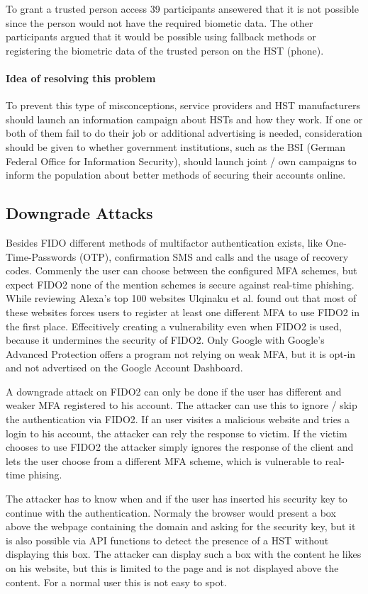 \documentclass[runningheads]{llncs}
\begin{document}
To grant a trusted person access 39 participants ansewered that it is not possible since the person would not have the required biometic data. The other participants argued that it would be possible using fallback methods or registering the biometric data of the trusted person on the HST (phone).

\paragraph{Idea of resolving this problem}
To prevent this type of misconceptions, service providers and HST manufacturers should launch an information campaign about HSTs and how they work. 
If one or both of them fail to do their job or additional advertising is needed, consideration should be given to whether government institutions, such as the BSI (German Federal Office for Information Security), should launch joint / own campaigns to inform the population about better methods of securing their accounts online.

\subsection{Downgrade Attacks}
Besides FIDO different methods of multifactor authentication exists, like One-Time-Passwords (OTP), confirmation SMS and calls and the usage of recovery codes. Commenly the user can choose between the configured MFA schemes, but expect FIDO2 none of the mention schemes is secure against real-time phishing. While reviewing Alexa's top 100 websites Ulqinaku et al. found out that most of these websites forces users to register at least one different MFA to use FIDO2 in the first place. Effecitively creating a vulnerability even when FIDO2 is used, because it undermines the security of FIDO2. Only Google with Google's Advanced Protection offers a program not relying on weak MFA, but it is opt-in and not advertised on the Google Account Dashboard.

A downgrade attack on FIDO2 can only be done if the user has different and weaker MFA registered to his account. The attacker can use this to ignore / skip the authentication via FIDO2. If an user visites a malicious website and tries a login to his account, the attacker can rely the response to victim. If the victim chooses to use FIDO2 the attacker simply ignores the response of the client and lets the user choose from a different MFA scheme, which is vulnerable to real-time phising.

The attacker has to know when and if the user has inserted his security key to continue with the authentication. Normaly the browser would present a box above the webpage containing the domain and asking for the security key, but it is also possible via API functions to detect the presence of a HST without displaying this box. The attacker can display such a box with the content he likes on his website, but this is limited to the page and is not displayed above the content. For a normal user this is not easy to spot.\cite{274610}
\end{document}
